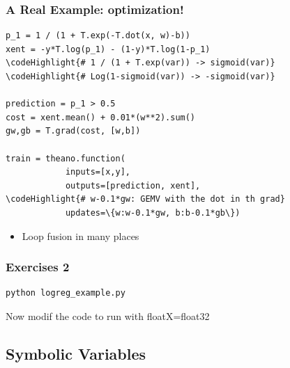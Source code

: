 \documentclass[a4paper,9pt]{beamer}
\begin{document}
\begin{frame}[fragile]
  \frametitle{A Real Example: optimization!}
\begin{Verbatim}[commandchars=\\\{\}]
p_1 = 1 / (1 + T.exp(-T.dot(x, w)-b))
xent = -y*T.log(p_1) - (1-y)*T.log(1-p_1)
\codeHighlight{# 1 / (1 + T.exp(var)) -> sigmoid(var)}
\codeHighlight{# Log(1-sigmoid(var)) -> -sigmoid(var)}

prediction = p_1 > 0.5
cost = xent.mean() + 0.01*(w**2).sum()
gw,gb = T.grad(cost, [w,b])

train = theano.function(
            inputs=[x,y],
            outputs=[prediction, xent],
\codeHighlight{# w-0.1*gw: GEMV with the dot in th grad}
            updates=\{w:w-0.1*gw, b:b-0.1*gb\})

\end{Verbatim}
\begin{itemize}
\item Loop fusion in many places
\end{itemize}
\end{frame}

\begin{frame}[fragile]
\frametitle{Exercises 2}
\begin{Verbatim}
python logreg_example.py
\end{Verbatim}
\vfill
Now modif the code to run with floatX=float32
\end{frame}

\subsection{Symbolic Variables}
\end{document}
